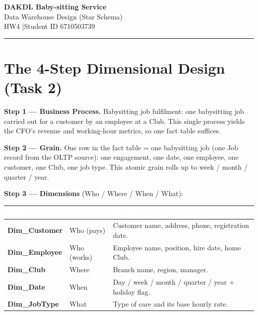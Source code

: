 \documentclass[11pt]{article}
\newcommand{\code}[1]{{\ttfamily #1}}
\begin{document}
\begin{center}
  {\LARGE\bfseries\color{factHead} DAKDL Baby-sitting Service}\\[2pt]
  {\large Data Warehouse Design (Star Schema)}\\[4pt]
  {\small HW4 \quad|\quad Student ID 6710503739}
\end{center}
\vspace{2pt}\noindent\textcolor{tblHead}{\rule{\linewidth}{0.8pt}}

\section{The 4-Step Dimensional Design (Task 2)}

\noindent\textbf{Step 1 — Business Process.}\quad
Babysitting job fulfilment: one babysitting job carried out for a customer by an
employee at a Club. This single process yields the CFO's revenue and working-hour
metrics, so one fact table suffices.

\smallskip
\noindent\textbf{Step 2 — Grain.}\quad
One row in the fact table = one babysitting job (one \code{Job} record from the
OLTP source): one engagement, one date, one employee, one customer, one Club, one
job type. This atomic grain rolls up to week / month / quarter / year.

\smallskip
\noindent\textbf{Step 3 — Dimensions} (Who / Where / When / What):

\vspace{2pt}
\noindent\begin{tabularx}{\linewidth}{@{}>{\small\bfseries\ttfamily}p{3.2cm} >{\small}p{1.6cm} Y@{}}
\toprule
{}
\textcolor{white}{Dimension} & \textcolor{white}{Role} & \textcolor{white}{Provides}\\
\midrule
Dim\_Customer & Who (pays)  & Customer name, address, phone, registration date.\\
Dim\_Employee & Who (works) & Employee name, position, hire date, home Club.\\
Dim\_Club     & Where       & Branch name, region, manager.\\
Dim\_Date     & When        & Day / week / month / quarter / year + holiday flag.\\
Dim\_JobType  & What        & Type of care and its base hourly rate.\\
\bottomrule
\end{tabularx}
\vspace{2pt}
\end{document}

